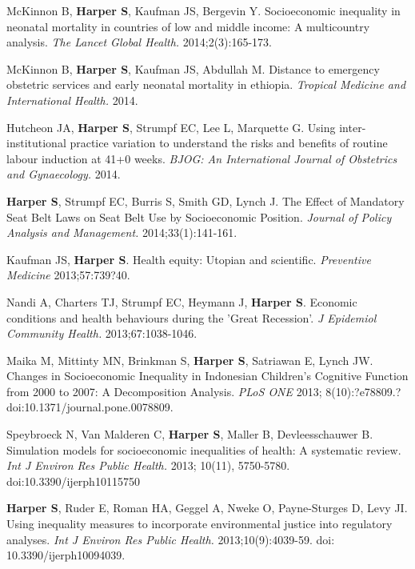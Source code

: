 \documentclass[
  letterpaper,
  DIV=11,
  numbers=noendperiod]{scrartcl}
\begin{document}
\begin{etaremune}
\item *McKinnon B, \textbf{Harper S}, Kaufman JS, Bergevin Y. Socioeconomic inequality in neonatal mortality in countries of low and middle income: A multicountry analysis. \emph{The Lancet Global Health.} 2014;2(3):165-173.
 
\item *McKinnon B, \textbf{Harper S}, Kaufman JS, Abdullah M. Distance to emergency obstetric services and early neonatal mortality in ethiopia. \emph{Tropical Medicine and International Health.} 2014.
 
\item Hutcheon JA, \textbf{Harper S}, Strumpf EC, Lee L, Marquette G. Using inter-institutional practice variation to understand the risks and benefits of routine labour induction at 41+0 weeks. \emph{BJOG: An International Journal of Obstetrics and Gynaecology.} 2014.
 
\item \textbf{Harper S}, Strumpf EC, Burris S, Smith GD, Lynch J. The Effect of Mandatory Seat Belt Laws on Seat Belt Use by Socioeconomic Position. \emph{Journal of Policy Analysis and Management.} 2014;33(1):141-161.

\item Kaufman JS, \textbf{Harper S}. Health equity: Utopian and scientific. \emph{Preventive Medicine} 2013;57:739?40.
 
\item Nandi A, Charters TJ, Strumpf EC, Heymann J, \textbf{Harper S}. Economic conditions and health behaviours during the 'Great Recession'. \emph{J Epidemiol Community Health.} 2013;67:1038-1046.
 
\item Maika M, Mittinty MN, Brinkman S, \textbf{Harper S}, Satriawan E, Lynch JW. Changes in Socioeconomic Inequality in Indonesian Children's Cognitive Function from 2000 to 2007: A Decomposition Analysis.  \emph{PLoS ONE} 2013; 8(10):?e78809.?doi:10.1371/journal.pone.0078809.
 
\item Speybroeck N, Van Malderen C, \textbf{Harper S}, Maller B, Devleesschauwer B. Simulation models for socioeconomic inequalities of health: A systematic review. \emph{Int J Environ Res Public Health.} 2013; 10(11), 5750-5780. doi:10.3390/ijerph10115750
 
\item \textbf{Harper S}, Ruder E, Roman HA, Geggel A, Nweke O, Payne-Sturges D, Levy JI. Using inequality measures to incorporate environmental justice into regulatory analyses. \emph{Int J Environ Res Public Health.} 2013;10(9):4039-59. doi: 10.3390/ijerph10094039.
 

\end{etaremune}
\end{document}
